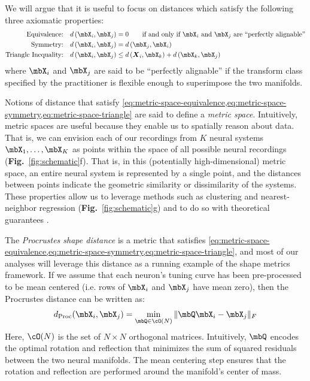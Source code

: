 We will argue that it is useful to focus on distances which satisfy the following three axiomatic properties:
\begin{align}
\label{eq:metric-space-equivalence}
\text{Equivalence:} & \quad d\left(\mbX_i, \mbX_j\right)=0 \qquad \text{if and only if $\mbX_i$ and $\mbX_j$ are ``perfectly alignable''}\\
\label{eq:metric-space-symmetry}
\text{Symmetry:} & \quad d\left(\mbX_i, \mbX_j \right) =d\left(\mbX_j, \mbX_i \right)\\
\label{eq:metric-space-triangle}
\text{Triangle Inequality:} & \quad d\left(\mbX_i, \mbX_j \right) \leq d\left(\boldsymbol{X}_i, \mbX_k \right) + d\left(\mbX_k, \mbX_j \right)
\end{align}
where $\mbX_i$ and $\mbX_j$ are said to be ``perfectly alignable'' if the transform class specified by the practitioner is flexible enough to superimpose the two manifolds.

Notions of distance that satisfy \cref{eq:metric-space-equivalence,eq:metric-space-symmetry,eq:metric-space-triangle} are said to define a \textit{metric space}.
Intuitively, metric spaces are useful because they enable us to spatially reason about data.
That is, we can envision each of our recordings from $K$ neural systems $\mbX_1, \dots, \mbX_K$ as points within the space of all possible neural recordings (\textbf{Fig.}~\ref{fig:schematic}f).
That is, in this (potentially high-dimensional) metric space, an entire neural system is represented by a single point, and the distances between points indicate the geometric similarity or dissimilarity of the systems.   
These properties allow us to leverage methods such as clustering and nearest-neighbor regression (\textbf{Fig.}~\ref{fig:schematic}g) and to do so with theoretical guarantees \parencite[see e.g.][]{Cover1967,Dasgupta2005}.

The \textit{Procrustes shape distance} \parencite{schonemann1966generalized} is a metric that satisfies \cref{eq:metric-space-equivalence,eq:metric-space-symmetry,eq:metric-space-triangle}, and most of our analyses will leverage this distance as a running example of the shape metrics framework.
If we assume that each neuron's tuning curve has been pre-processed to be mean centered (i.e. rows of $\mbX_i$ and $\mbX_j$ have mean zero), then the Procrustes distance can be written as:
\begin{equation}
\label{eq:procrustes-distance}
d_{\text{Proc}}(\mbX_i, \mbX_j) = \min_{\mbQ \in \cO(N)} \Vert \mbQ \mbX_i - \mbX_j \Vert_F
\end{equation}
Here, $\cO(N)$ is the set of $N \times N$ orthogonal matrices.
Intuitively, $\mbQ$ encodes the optimal rotation and reflection that minimizes the sum of squared residuals between the two neural manifolds.
The mean centering step ensures that the rotation and reflection are performed around the manifold's center of mass.

